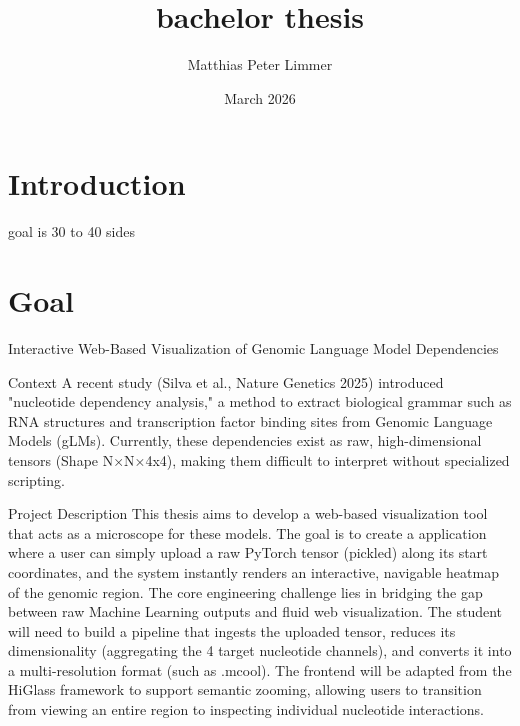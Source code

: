 \documentclass{article}
\title{bachelor thesis}
\author{Matthias Peter Limmer }
\date{March 2026}
\begin{document}
\maketitle

\section{Introduction}

goal is 30 to 40 sides

\section{Goal}
Interactive Web-Based Visualization of Genomic Language Model Dependencies

Context
A recent study (Silva et al., Nature Genetics 2025) introduced "nucleotide dependency analysis," a method to extract biological grammar such as RNA structures and transcription factor binding sites from Genomic Language Models (gLMs). Currently, these dependencies exist as raw, high-dimensional tensors (Shape N×N×4x4), making them difficult to interpret without specialized scripting.

Project Description
This thesis aims to develop a web-based visualization tool that acts as a microscope for these models. The goal is to create a application where a user can simply upload a raw PyTorch tensor (pickled) along its start coordinates, and the system instantly renders an interactive, navigable heatmap of the genomic region.
The core engineering challenge lies in bridging the gap between raw Machine Learning outputs and fluid web visualization. The student will need to build a pipeline that ingests the uploaded tensor, reduces its dimensionality (aggregating the 4 target nucleotide channels), and converts it into a multi-resolution format (such as .mcool). The frontend will be adapted from the HiGlass framework to support semantic zooming, allowing users to transition from viewing an entire region to inspecting individual nucleotide interactions.
\end{document}
